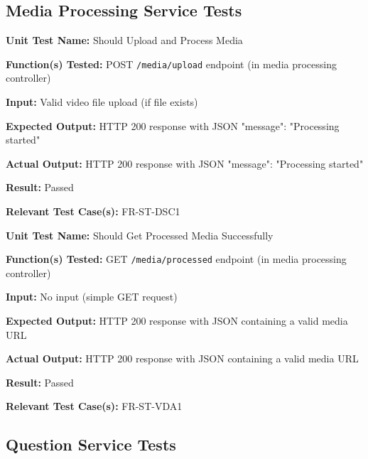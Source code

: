 \documentclass[12pt, titlepage]{article}
\begin{document}
\subsection*{Media Processing Service Tests}

\begin{mdframed}[linewidth=0.5mm]
\textbf{Unit Test Name:} Should Upload and Process Media \par
\textbf{Function(s) Tested:} POST \texttt{/media/upload} endpoint (in media processing controller) \par
\textbf{Input:} Valid video file upload (if file exists) \par
\textbf{Expected Output:} HTTP 200 response with JSON {"message": "Processing started"} \par
\textbf{Actual Output:} HTTP 200 response with JSON {"message": "Processing started"} \par
\textbf{Result:} Passed \par
\textbf{Relevant Test Case(s):} FR-ST-DSC1
\end{mdframed}

\begin{mdframed}[linewidth=0.5mm]
\textbf{Unit Test Name:} Should Get Processed Media Successfully \par
\textbf{Function(s) Tested:} GET \texttt{/media/processed} endpoint (in media processing controller) \par
\textbf{Input:} No input (simple GET request) \par
\textbf{Expected Output:} HTTP 200 response with JSON containing a valid media URL \par
\textbf{Actual Output:} HTTP 200 response with JSON containing a valid media URL \par
\textbf{Result:} Passed \par
\textbf{Relevant Test Case(s):} FR-ST-VDA1
\end{mdframed}

\subsection*{Question Service Tests}
\end{document}
